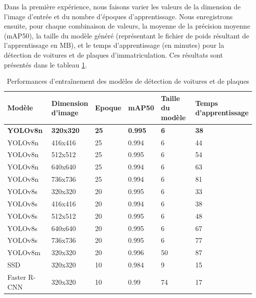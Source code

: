 Dans la première expérience, nous faisons varier les valeurs de la dimension de l'image d'entrée et du nombre d'époques d'apprentissage. Nous enregistrons ensuite, pour chaque combinaison de valeurs, la moyenne de la précision moyenne (mAP50), la taille du modèle généré (représentant le fichier de poids résultant de l'apprentissage en MB), et le temps d'apprentissage (en minutes) pour la détection de voitures et de plaques d'immatriculation. Ces résultats sont présentés dans le tableau \ref{table:ch4-training_car_allmodels}.

\begin{table}[h]
	\centering
    \begin{tabular}{|l|l|l|l|l|l|}
    \hline
        Modèle & \shortstack{Dimension \\ d'image}  & Epoque &    mAP50 & \shortstack{Taille \\du modèle}   & \shortstack{Temps\\ d'apprentissage } \\ \hline
        \textbf{YOLOv8n} & \textbf{320x320} &      \textbf{25}     & \textbf{0.995} &  \textbf{6} &      \textbf{38}    \\ \hline
        YOLOv8n &  416x416 &     25     & 0.994  & 6 &     44    \\ \hline
        YOLOv8n & 512x512  &     25    & 0.995   &  6 &  54     \\ \hline
        YOLOv8n & 640x640 &      25     &  0.994    &  6 &   63   \\ \hline
        YOLOv8n & 736x736 &      25     &  0.994  &  6 &       81    \\ \hline
        YOLOv8s & 320x320 &      20      & 0.995  &   6 &     33     \\ \hline
        YOLOv8s & 416x416&       20      & 0.994 &  6 &      38    \\ \hline
        YOLOv8s & 512x512 &       20     &   0.995  &     6 &      48   \\ \hline
        YOLOv8s &  640x640&        20     &  0.995 & 6 &      67     \\ \hline
        YOLOv8s & 736x736  &       20     &   0.995 &   6 &       77   \\ \hline
        YOLOv8m & 320x320  &        20   &  0.996  & 50 &     87     \\ \hline
        SSD     & 320x320  &         10   &  0.984    &   9  &   15   \\ \hline
        Faster R-CNN & 320x320   &   10    &  0.99  &  74 &  17     \\ \hline
    \end{tabular}
    \caption{Performances d'entraînement des modèles de détection de voitures et de plaques}
    \label{table:ch4-training_car_allmodels}
\end{table}

